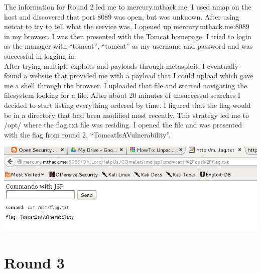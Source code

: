 \documentclass[12pt]{report}
\newcommand{\mychapter}[2]{
    \setcounter{chapter}{#1}
    \setcounter{section}{0}
    \chapter*{#2}
    \addcontentsline{toc}{chapter}{#2}
}
\begin{document}
The information for Round 2 led me to mercury.mthack.me. I used nmap on the host and discovered that port 8089 was open, but was unknown. After using netcat to try to tell what the service was, I opened up mercury.mthack.me:8089 in my browser. I was then presented with the Tomcat homepage. I tried to login as the manager with ``tomcat'', ``tomcat'' as my username and password and was successful in logging in.\\
\newline
After trying multiple exploits and payloads through metasploit, I eventually found a website \cite{tonylee2012} that provided me with a payload that I could upload which gave me a shell through the browser. I uploaded that file and started navigating the filesystem looking for a file. After about 20 minutes of unsuccessul searches I decided to start listing everything ordered by time. I figured that the flag would be in a directory that had been modified most recently. This strategy led me to /opt/ where the flag.txt file was residing. I opened the file and was presented with the flag from round 2, ``TomcatIsAVulnerability''.\\
\newline
\begin{center}
\includegraphics[scale=0.33]{TomcatIsAVulnerability.png}
\end{center}


\mychapter{3}{Round 3}
\end{document}
